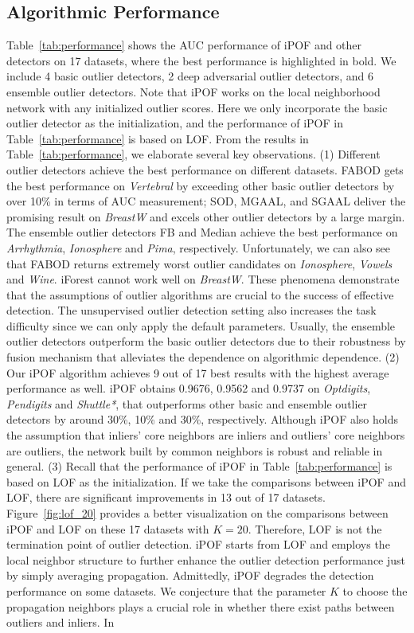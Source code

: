 \documentclass[sigconf,nonacm]{acmart}
\begin{document}
\subsection{Algorithmic Performance}
Table\textcolor{red}{~\ref{tab:performance}} shows the AUC performance of iPOF and other detectors on 17 datasets, where the best performance is highlighted in bold. We include 4 basic outlier detectors, 2 deep adversarial outlier detectors, and 6 ensemble outlier detectors. Note that iPOF works on the local neighborhood network with any initialized outlier scores. Here we only incorporate the basic outlier detector as the initialization, and the performance of iPOF in Table\textcolor{red}{~\ref{tab:performance}} is based on LOF. From the results in Table\textcolor{red}{~\ref{tab:performance}}, we elaborate several key observations. (1) Different outlier detectors achieve the best performance on different datasets. FABOD gets the best performance on \textit{Vertebral} by exceeding other basic outlier detectors by over 10\% in terms of AUC measurement; SOD, MGAAL, and SGAAL deliver the promising result on \textit{BreastW} and excels other outlier detectors by a large margin. The ensemble outlier detectors FB and Median achieve the best performance on \textit{Arrhythmia}, \textit{Ionosphere} and \textit{Pima}, respectively. Unfortunately, we can also see that FABOD returns extremely worst outlier candidates on \textit{Ionosphere}, \textit{Vowels} and \textit{Wine}. iForest cannot work well on \textit{BreastW}. These phenomena demonstrate that the assumptions of outlier algorithms are crucial to the success of effective detection. The unsupervised outlier detection setting also increases the task difficulty since we can only apply the default parameters. Usually, the ensemble outlier detectors outperform the basic outlier detectors due to their robustness by fusion mechanism that alleviates the dependence on algorithmic dependence. (2) Our iPOF algorithm achieves 9 out of 17 best results with the highest average performance as well. iPOF obtains 0.9676, 0.9562 and 0.9737 on \textit{Optdigits}, \textit{Pendigits} and \textit{Shuttle*}, that outperforms other basic and ensemble outlier detectors by around 30\%, 10\% and 30\%, respectively. Although iPOF also holds the assumption that inliers' core neighbors are inliers and outliers' core neighbors are outliers, the network built by common neighbors is robust and reliable in general. (3) Recall that the performance of iPOF in Table\textcolor{red}{~\ref{tab:performance}} is based on LOF as the initialization. If we take the comparisons between iPOF and LOF, there are significant improvements in 13 out of 17 datasets. Figure\textcolor{red}{~\ref{fig:lof_20}} provides a better visualization on the comparisons between iPOF and LOF on these 17 datasets with $K=20$. Therefore, LOF is not the termination point of outlier detection. iPOF starts from LOF and employs the local neighbor structure to further enhance the outlier detection performance just by simply averaging propagation. Admittedly, iPOF degrades the detection performance on some datasets. We conjecture that the parameter $K$ to choose the propagation neighbors plays a crucial role in whether there exist paths between outliers and inliers. In 
\end{document}
